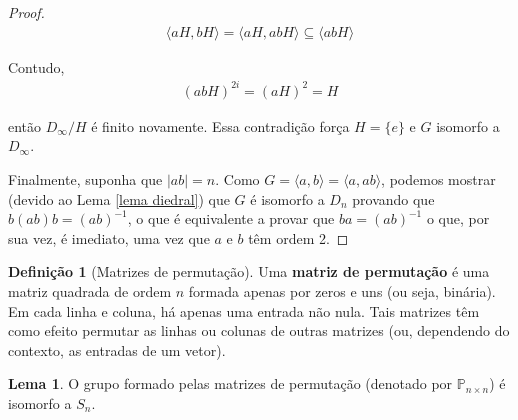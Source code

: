 \documentclass[a4paper,portuguese,11pt,twoside, leqno]{book}
\theoremstyle{definition}
\newtheorem{lemma}[theorem]{Lema}
\newtheorem{deff}{Definição}[section]
\begin{document}
\begin{proof}
		\begin{align*}
		\langle aH, bH \rangle = \langle aH, abH \rangle\subseteq \langle abH \rangle
		\end{align*}
		\par\vspace{0.3cm} Contudo, 
		\begin{align*}
		(abH)^{2i} = (aH)^2 = H
		\end{align*}
		\par\vspace{0.3cm} então $D_{\infty}/H$ é finito novamente. Essa contradição força $H = \{e\}$ e $G$ isomorfo a $D_{\infty}$.
		\par\vspace{0.3cm} Finalmente, suponha que $|ab| = n$. Como $G = \langle a,b \rangle = \langle a,ab \rangle$, podemos mostrar (devido ao Lema \eqref{lema diedral}) que $G$ é isomorfo a $D_n$ provando que $b(ab)b = (ab)^{-1}$, o que é equivalente a provar que $ba = (ab)^{-1}$ o que, por sua vez, é imediato, uma vez que $a$ e $b$ têm ordem 2.
		
	\end{proof}
	
	\par\vspace{0.3cm}
	
	\begin{deff}[Matrizes de permutação]
		Uma \textbf{matriz de permutação} é uma matriz quadrada de ordem $n$ formada apenas por zeros e uns (ou seja, binária). Em cada linha e coluna, há apenas uma entrada não nula. Tais matrizes têm como efeito permutar as linhas ou colunas de outras matrizes (ou, dependendo do contexto, as entradas de um vetor).
	\end{deff}
	
	\par\vspace{0.3cm}
	
	\begin{lemma}
		\label{matrizes de permutacao}
		O grupo formado pelas matrizes de permutação (denotado por $\mathbb{P}_{n\times n}$) é isomorfo a $S_n$.
	\end{lemma}
	
\end{document}
